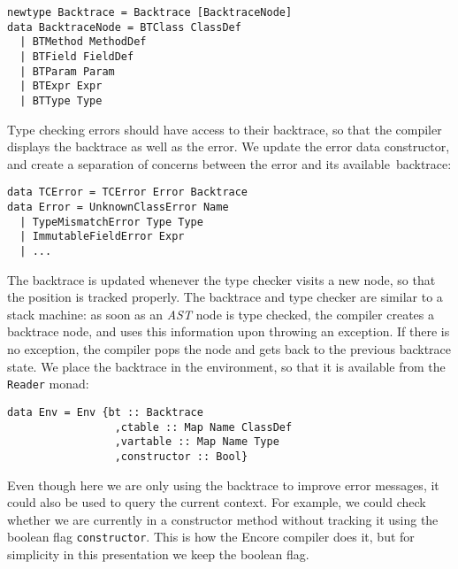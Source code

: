 \documentclass[sigplan,screen]{acmart}
\makeatletter
\newcommand{\ec}[1]{\lstinline[style=encore,breaklines=true,basicstyle=\fontsize{9}{9}\tt]@#1@}
\newcommand{\astt}[0]{\textit{AST}}
\makeatother
\begin{document}
\begin{minipage}[t]{.55\linewidth}
\begin{lstlisting}[style=encore]
newtype Backtrace = Backtrace [BacktraceNode]
data BacktraceNode = BTClass ClassDef
  | BTMethod MethodDef
  | BTField FieldDef
  | BTParam Param
  | BTExpr Expr
  | BTType Type
\end{lstlisting}
\end{minipage}

Type checking errors should have access to their backtrace, so that
the compiler displays the backtrace as well as the error. We update the
error data constructor, and create a separation of
concerns between the error and its available~backtrace:

\begin{minipage}[t]{\linewidth}
\begin{lstlisting}[style=encore]
data TCError = TCError Error Backtrace
data Error = UnknownClassError Name
  | TypeMismatchError Type Type
  | ImmutableFieldError Expr
  | ...
\end{lstlisting}
\end{minipage}

The backtrace is updated
whenever the type checker visits a new node,
so that the position is tracked properly. The backtrace and type checker are similar to a stack machine:
as soon as an \astt{} node is type checked, the compiler creates a backtrace node,
and uses this information upon throwing an exception. If there is
no exception, the compiler pops the node and gets back to the previous backtrace state.
We place the backtrace in the environment, so that it is available
from the \ec{Reader} monad:

\begin{minipage}[t]{\linewidth}
\begin{lstlisting}[style=encore]
data Env = Env {bt :: Backtrace
                 ,ctable :: Map Name ClassDef
                 ,vartable :: Map Name Type
                 ,constructor :: Bool}
\end{lstlisting}
\end{minipage}

Even though here we are only using the backtrace to improve error
messages, it could also be used to query the current context. For
example, we could check whether we are currently in a constructor
method without tracking it using the boolean flag
\ec{constructor}. This is how the Encore compiler does it, but for
simplicity in this presentation we keep the boolean flag.
\end{document}
